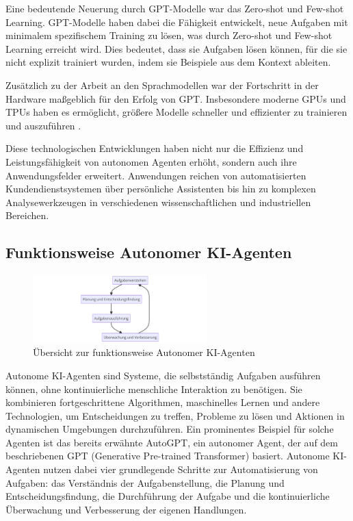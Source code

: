\documentclass[conference]{IEEEtran}
\begin{document}
Eine bedeutende Neuerung durch GPT-Modelle war das Zero-shot und Few-shot Learning\cite{kim_cot_2023}. GPT-Modelle haben dabei die Fähigkeit entwickelt, neue Aufgaben mit minimalem spezifischem Training zu lösen, was durch Zero-shot und Few-shot Learning erreicht wird. Dies bedeutet, dass sie Aufgaben lösen können, für die sie nicht explizit trainiert wurden, indem sie Beispiele aus dem Kontext ableiten\cite{brown_language_2020}.

Zusätzlich zu der Arbeit an den Sprachmodellen war der Fortschritt in der Hardware maßgeblich für den Erfolg von GPT. Insbesondere moderne GPUs und TPUs haben es ermöglicht, größere Modelle schneller und effizienter zu trainieren und auszuführen \cite{jeremy_training_2024}.

Diese technologischen Entwicklungen haben nicht nur die Effizienz und Leistungsfähigkeit von autonomen Agenten erhöht, sondern auch ihre Anwendungsfelder erweitert. Anwendungen reichen von automatisierten Kundendienstsystemen über persönliche Assistenten bis hin zu komplexen Analysewerkzeugen in verschiedenen wissenschaftlichen und industriellen Bereichen.

\subsection{Funktionsweise Autonomer KI-Agenten}

\begin{figure}[!htbp]
    \centering
    \includegraphics[width=0.6\textwidth]{prozess.png}
    \caption{Übersicht zur funktionsweise Autonomer KI-Agenten\cite{chu_240203628_nodate}}
    \label{fig:enter-label}
\end{figure}

Autonome KI-Agenten sind Systeme, die selbstständig Aufgaben ausführen können, ohne kontinuierliche menschliche Interaktion zu benötigen. Sie kombinieren fortgeschrittene Algorithmen, maschinelles Lernen und andere Technologien, um Entscheidungen zu treffen, Probleme zu lösen und Aktionen in dynamischen Umgebungen durchzuführen. Ein prominentes Beispiel für solche Agenten ist das bereits erwähnte AutoGPT\cite{significant_gravitas_autogpt_2024}, ein autonomer Agent, der auf dem beschriebenen GPT (Generative Pre-trained Transformer) basiert. Autonome KI-Agenten nutzen dabei vier grundlegende Schritte zur Automatisierung von Aufgaben: das Verständnis der Aufgabenstellung, die Planung und Entscheidungsfindung, die Durchführung der Aufgabe und die kontinuierliche Überwachung und Verbesserung der eigenen Handlungen.
\end{document}

